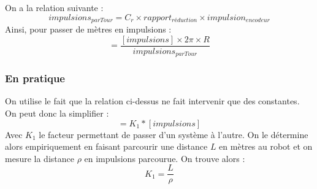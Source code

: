         On a la relation suivante :
        \begin{equation}
            impulsions_{parTour} = C_r \times rapport_{réduction} \times impulsion_{encodeur}
        \end{equation}
        Ainsi, pour passer de mètres en impulsions :
        \begin{equation}
            [m] = \frac{[impulsions] \times 2\pi \times R}{impulsions_{parTour}}
        \end{equation}

        \subsubsection{En pratique}
            On utilise le fait que la relation ci-dessus ne fait intervenir que des constantes.\\
            On peut donc la simplifier :
            \begin{equation}
                [m] = K_1 * [impulsions]
            \end{equation}
            Avec $K_1$ le facteur permettant de passer d’un système à l’autre. On le détermine alors empiriquement en faisant parcourir une distance $L$ en mètres au robot et on mesure la distance $\rho$ en impulsions parcourue. On trouve alors :
            \begin{equation}
                K_1 = \frac{L}{\rho}
            \end{equation}

    \newpage
